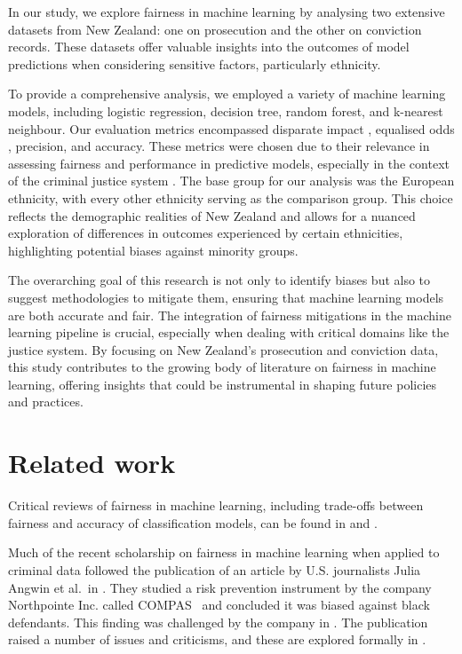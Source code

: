 \documentclass[runningheads]{llncs}
\begin{document}
In our study, we explore fairness in machine learning by analysing two
extensive datasets from New Zealand: one on prosecution and the other
on conviction records. These datasets offer valuable insights into the
outcomes of model predictions when considering sensitive factors,
particularly ethnicity.

To provide a comprehensive analysis, we employed a variety of machine
learning models, including logistic regression, decision tree, random
forest, and k-nearest neighbour. Our evaluation metrics encompassed
disparate impact \cite{feldman2015certifying}, equalised odds
\cite{hardt2016equality}, precision, and accuracy. These metrics were
chosen due to their relevance in assessing fairness and performance in
predictive models, especially in the context of the criminal justice
system \cite{caton2020fairness,%
    chouldechova2017fair,corbett2017algorithmic}. The base group for
our analysis was the European ethnicity, with every other ethnicity
serving as the comparison group. This choice reflects the demographic
realities of New Zealand and allows for a nuanced exploration of
differences in outcomes experienced by certain ethnicities,
highlighting potential biases against minority groups.

The overarching goal of this research is not only to identify biases
but also to suggest methodologies to mitigate them, ensuring that
machine learning models are both accurate and fair. The integration of
fairness mitigations in the machine learning pipeline is crucial,
especially when dealing with critical domains like the justice system.
By focusing on New Zealand's prosecution and conviction data, this
study contributes to the growing body of literature on fairness in
machine learning, offering insights that could be instrumental in
shaping future policies and practices.

\section{Related work}
\label{sec:related-work}

Critical reviews of fairness in machine learning, including trade-offs
between fairness and accuracy of classification models, can be found
in \cite{corbett2018measure} and \cite{romei2014multidisciplinary}.

Much of the recent scholarship on fairness in machine learning when
applied to criminal data followed the publication of an article by
U.S. journalists Julia Angwin et al.\ in \cite{angwin2016machine}.
They studied a risk prevention instrument by the company Northpointe
Inc. called COMPAS~\cite{compascore} and concluded it was biased
against black defendants. This finding was challenged by the company
in \cite{dieterich2016compas}. The publication raised a number of
issues and criticisms, and these are explored formally in
\cite{chouldechova2017fair}.
\end{document}
